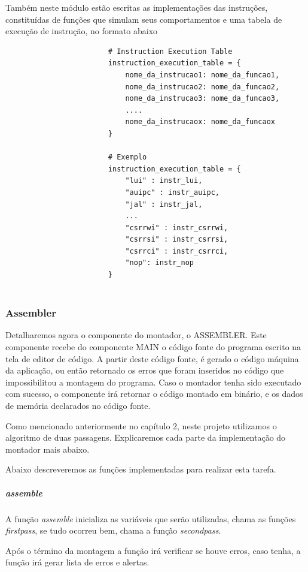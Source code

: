 					Também neste módulo estão escritas as implementações das instruções, constituídas de funções que simulam seus comportamentos e uma tabela de execução de instrução, no formato abaixo


					\begin{verbatim}
						# Instruction Execution Table
						instruction_execution_table = { 
						    nome_da_instrucao1: nome_da_funcao1,
						    nome_da_instrucao2: nome_da_funcao2,
						    nome_da_instrucao3: nome_da_funcao3,						    
						    ....
						    nome_da_instrucaox: nome_da_funcaox
						}						  		    
						
						# Exemplo
						instruction_execution_table = {
						    "lui" : instr_lui,
						    "auipc" : instr_auipc,
						    "jal" : instr_jal,
						    ...
						    "csrrwi" : instr_csrrwi,
						    "csrrsi" : instr_csrrsi,
						    "csrrci" : instr_csrrci,
						    "nop": instr_nop
						}


					\end{verbatim}

		\subsubsection{Assembler}			
			
			Detalharemos agora o componente do montador, o ASSEMBLER. Este componente recebe do componente MAIN o código fonte do programa escrito na tela de editor de código. A partir deste código fonte, é gerado o código máquina da aplicação, ou então retornado os erros que foram inseridos no código que impossibilitou a montagem do programa. Caso o montador tenha sido executado com sucesso, o componente irá retornar o código montado em binário, e os dados de memória declarados no código fonte.

			Como mencionado anteriormente no capítulo 2, neste projeto utilizamos o algoritmo de duas passagens. Explicaremos cada parte da implementação do montador mais abaixo.

			Abaixo descreveremos as funções implementadas para realizar esta tarefa.

			\subparagraph{assemble}
				A função \textit{assemble} inicializa as variáveis que serão utilizadas, chama as funções \textit{first\textunderscore pass}, se tudo ocorreu bem, chama a função \textit{second\textunderscore pass}. 

				Após o término da montagem a função irá verificar se houve erros, caso tenha, a função irá gerar lista de erros e alertas.

